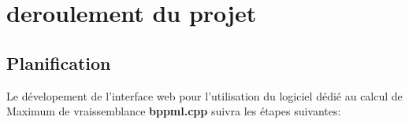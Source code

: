 
%

\section{deroulement du projet} 

\subsection{Planification}

Le dévelopement de l'interface web pour l'utilisation du logiciel dédié au calcul de Maximum de vraissemblance \textbf{bppml.cpp} suivra les étapes suivantes:

